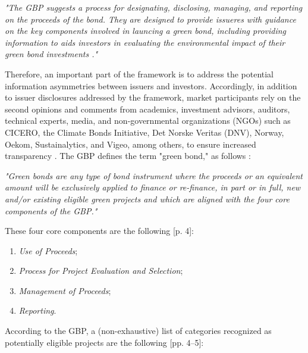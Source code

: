  
\vspace{.3cm}

\textit{
"The GBP suggests a process for designating, disclosing, managing, and reporting on the proceeds of the bond. They are designed to provide issueres with guidance on the key components involved in launcing a green bond, including providing information to aids investors in evaluating the environmental impact of their green bond investments \citep[p. 30]{worldbank2015}."}

\vspace{.3cm}
Therefore, an important part of the framework is to address the potential information asymmetries between issuers and investors. Accordingly, in addition to issuer disclosures addressed by the framework, market participants rely on the second opinions and comments from academics, investment advisors, auditors, technical experts, media, and non-governmental organizations (NGOs) such as CICERO, the Climate Bonds Initiative, Det Norske Veritas (DNV), Norway, Oekom, Sustainalytics, and Vigeo, among others, to ensure increased transparency \citep[p. 31]{worldbank2015}. 
The GBP defines the term "green bond," as follows \citep[p. 3]{international2022green}:
\vspace{.3cm}

\textit{
"Green bonds are any type of bond instrument where the proceeds or an equivalent amount will be exclusively applied to finance or re-finance, in part or in full, new and/or existing eligible green projects and which are aligned with the four core components of the GBP."} 
\vspace{.3cm}

These four core components are the following [p. 4]:

\begin{enumerate}
    \item \textit{Use of Proceeds};
    \item \textit{Process for Project Evaluation and Selection};
    \item \textit{Management of Proceeds};
    \item \textit{Reporting}.
\end{enumerate}

According to the GBP, a (non-exhaustive) list of categories recognized as potentially eligible projects are the following [pp. 4--5]:  

